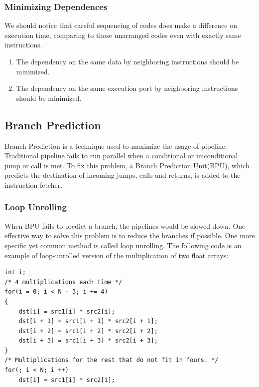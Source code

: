\documentclass[a4paper]{report}
\begin{document}
\subsubsection{Minimizing Dependences} \indent

	We should notice that careful sequencing of codes does make a difference on execution time, comparing to those unarranged codes even with exactly same instructions.
	
	\begin{enumerate}
	
	\item The dependency on the same data by neighboring instructions should be minimized.
	
	\item The dependency on the same execution port by neighboring instructions should be minimized.

	\end{enumerate}
\subsection{Branch Prediction} \indent

	Branch Prediction is a technique used to maximize the usage of pipeline. Traditional pipeline fails to run parallel when a conditional or unconditional jump or call is met. To fix this problem, a Branch Prediction Unit(BPU), which predicts the destination of incoming jumps, calls and returns, is added to the instruction fetcher. \cite{intelopt} %
	
\subsubsection{Loop Unrolling} \indent
	
	When BPU fails to predict a branch, the pipelines would be slowed down. One effective way to solve this problem is to reduce the branches if possible. One more specific yet common method is called loop unrolling. The following code is an example of loop-unrolled version of the multiplication of two float arrays:
	
        \lstset{language = c, tabsize = 4}
        \begin{lstlisting}
int i;
/* 4 multiplications each time */
for(i = 0; i < N - 3; i += 4)
{
	dst[i] = src1[i] * src2[i];
	dst[i + 1] = src1[i + 1] * src2[i + 1];
	dst[i + 2] = src1[i + 2] * src2[i + 2];
	dst[i + 3] = src1[i + 3] * src2[i + 3];
}
/* Multiplications for the rest that do not fit in fours. */
for(; i < N; i ++)
	dst[i] = src1[i] * src2[i];
        \end{lstlisting}
\end{document}
